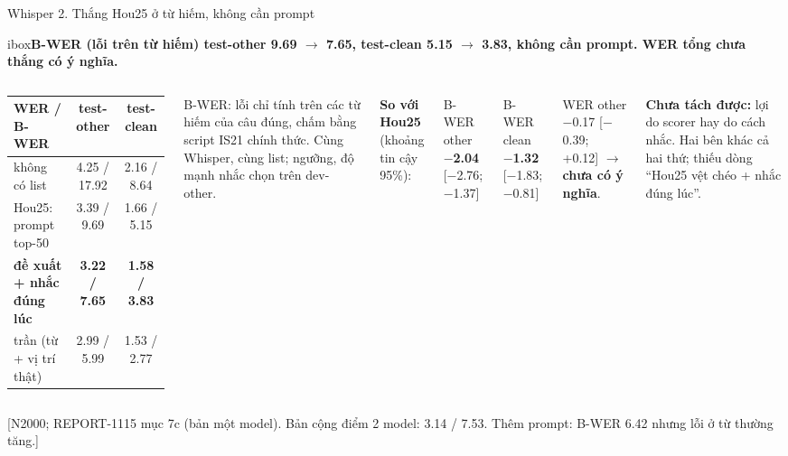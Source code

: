 \documentclass[aspectratio=169,xcolor=table]{beamer}
\newcommand{\bad}[1]{\textcolor{RiskRed}{\textbf{#1}}}
\newcommand{\good}[1]{\textcolor{GoodGreen}{\textbf{#1}}}
\newcommand{\src}[1]{\par\vfill{\tiny\color{TextGray}[#1]}}
\newcommand{\ra}{$\rightarrow$}
\newcommand{\nb}[1]{\textcolor{Accent}{#1}}
\newcommand{\insight}[1]{\begin{beamercolorbox}[sep=0.55em,rounded=true]{ibox}\small\bfseries #1\end{beamercolorbox}\vspace{0.15cm}}
\begin{document}
\begin{frame}{Whisper 2. Thắng Hou25 ở từ hiếm, không cần prompt}
\insight{B-WER (lỗi trên từ hiếm) test-other \nb{9.69 \ra{} 7.65}, test-clean \nb{5.15 \ra{} 3.83}, không cần prompt. \nb{WER tổng chưa thắng có ý nghĩa.}}
\begin{columns}[T]
\renewcommand{\arraystretch}{1.15}\footnotesize\setlength{\tabcolsep}{4pt}
\begin{tabular}{lcc}
\toprule
WER / B-WER & test-other & test-clean \\
\midrule
không có list & 4.25 / 17.92 & 2.16 / 8.64 \\
Hou25: prompt top-50 & 3.39 / 9.69 & 1.66 / 5.15 \\
\rowcolor{Accent!15}\textbf{đề xuất + nhắc đúng lúc} & \textbf{3.22 / 7.65} & \textbf{1.58 / 3.83} \\
trần (từ + vị trí thật) & 2.99 / 5.99 & 1.53 / 2.77 \\
\bottomrule
\end{tabular}
\par\vspace{0.1cm}
{\scriptsize B-WER: lỗi chỉ tính trên các từ hiếm của câu đúng, chấm bằng script IS21 chính thức. Cùng Whisper, cùng list; ngưỡng, độ mạnh nhắc chọn trên dev-other.\par}
{\footnotesize\textbf{So với Hou25} (khoảng tin cậy 95\%):\par\vspace{0.05cm}
B-WER other \good{$-$2.04} [$-$2.76; $-$1.37]\par
B-WER clean \good{$-$1.32} [$-$1.83; $-$0.81]\par\vspace{0.1cm}
WER other $-$0.17 [$-$0.39; +0.12] \ra{} \bad{chưa có ý nghĩa}.\par\vspace{0.15cm}}
{\scriptsize\color{RiskRed}\textbf{Chưa tách được:} lợi do scorer hay do cách nhắc. Hai bên khác cả hai thứ; thiếu dòng ``Hou25 vệt chéo + nhắc đúng lúc''.\par}
\end{columns}
\src{N2000; REPORT-1115 mục 7c (bản một model). Bản cộng điểm 2 model: 3.14 / 7.53. Thêm prompt: B-WER 6.42 nhưng lỗi ở từ thường tăng.}
\end{frame}
\end{document}
